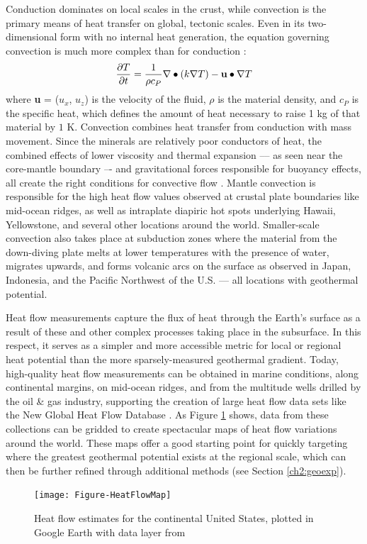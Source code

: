 Conduction dominates on local scales in the crust, while convection is the primary means of heat transfer on global, tectonic scales. Even in its two-dimensional form with no internal heat generation, the equation governing convection is much more complex than for conduction \citep[p.\ 355]{lowrie_fundamentals_2007}:
\begin{equation}\label{eq:convection}
\frac{\partial T}{\partial t} = \frac{1}{\rho c_P}\nabla\bullet\left(k\nabla T\right)-{\bf u}\bullet\nabla T
\end{equation}
where \textbf{u} = ($u_x$, $u_z$) is the velocity of the fluid, $\rho$ is the material density, and $c_P$ is the specific heat, which defines the amount of heat necessary to raise 1 kg of that material by $1$ K. Convection combines heat transfer from conduction with mass movement. Since the minerals are relatively poor conductors of heat, the combined effects of lower viscosity and thermal expansion --– as seen near the core-mantle boundary –- and gravitational forces responsible for buoyancy effects, all create the right conditions for convective flow \citep[p.\ 25]{glassley_geothermal_2015}. Mantle convection is responsible for the high heat flow values observed at crustal plate boundaries like mid-ocean ridges, as well as intraplate diapiric hot spots underlying Hawaii, Yellowstone, and several other locations around the world. Smaller-scale convection also takes place at subduction zones where the material from the down-diving plate melts at lower temperatures with the presence of water, migrates upwards, and forms volcanic arcs on the surface as observed in Japan, Indonesia, and the Pacific Northwest of the U.S. \citep[p.\ 31-33]{press_understanding_2004} --– all locations with geothermal potential.

Heat flow measurements capture the flux of heat through the Earth’s surface as a result of these and other complex processes taking place in the subsurface. In this respect, it serves as a simpler and more accessible metric for local or regional heat potential than the more sparsely-measured geothermal gradient. Today, high-quality heat flow measurements can be obtained in marine conditions, along continental margins, on mid-ocean ridges, and from the multitude wells drilled by the oil \& gas industry, supporting the creation of large heat flow data sets like the New Global Heat Flow Database \citep{lucazeau_analysis_2019}. As Figure \ref{fig:heatflow} shows, data from these collections can be gridded to create spectacular maps of heat flow variations around the world. These maps offer a good starting point for quickly targeting where the greatest geothermal potential exists at the regional scale, which can then be further refined through additional methods (see Section \ref{ch2:geoexp}).
\begin{figure}[h!]
\centering
\texttt{[image: Figure-HeatFlowMap]}
\caption[Heat flow across the continental U.S.]{Heat flow estimates for the continental United States, plotted in Google Earth with data layer from \protect\citep{lucazeau_analysis_2019}}
\label{fig:heatflow}
\end{figure}


